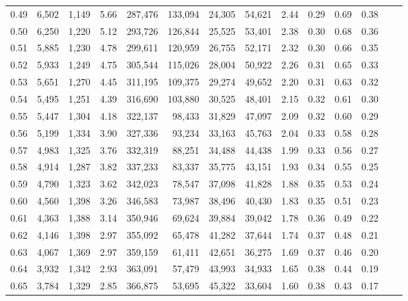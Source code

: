 \begin{tabular}{rrrrrrrrrrrrrr}
0.49 &  6,502 &  1,149 &    5.66 &  287,476 &  133,094 &  24,305 &  54,621 &  2.44 &  0.29 &  0.69 &      0.38 \\
0.50 &  6,250 &  1,220 &    5.12 &  293,726 &  126,844 &  25,525 &  53,401 &  2.38 &  0.30 &  0.68 &      0.36 \\
0.51 &  5,885 &  1,230 &    4.78 &  299,611 &  120,959 &  26,755 &  52,171 &  2.32 &  0.30 &  0.66 &      0.35 \\
0.52 &  5,933 &  1,249 &    4.75 &  305,544 &  115,026 &  28,004 &  50,922 &  2.26 &  0.31 &  0.65 &      0.33 \\
0.53 &  5,651 &  1,270 &    4.45 &  311,195 &  109,375 &  29,274 &  49,652 &  2.20 &  0.31 &  0.63 &      0.32 \\
0.54 &  5,495 &  1,251 &    4.39 &  316,690 &  103,880 &  30,525 &  48,401 &  2.15 &  0.32 &  0.61 &      0.30 \\
0.55 &  5,447 &  1,304 &    4.18 &  322,137 &   98,433 &  31,829 &  47,097 &  2.09 &  0.32 &  0.60 &      0.29 \\
0.56 &  5,199 &  1,334 &    3.90 &  327,336 &   93,234 &  33,163 &  45,763 &  2.04 &  0.33 &  0.58 &      0.28 \\
0.57 &  4,983 &  1,325 &    3.76 &  332,319 &   88,251 &  34,488 &  44,438 &  1.99 &  0.33 &  0.56 &      0.27 \\
0.58 &  4,914 &  1,287 &    3.82 &  337,233 &   83,337 &  35,775 &  43,151 &  1.93 &  0.34 &  0.55 &      0.25 \\
0.59 &  4,790 &  1,323 &    3.62 &  342,023 &   78,547 &  37,098 &  41,828 &  1.88 &  0.35 &  0.53 &      0.24 \\
0.60 &  4,560 &  1,398 &    3.26 &  346,583 &   73,987 &  38,496 &  40,430 &  1.83 &  0.35 &  0.51 &      0.23 \\
0.61 &  4,363 &  1,388 &    3.14 &  350,946 &   69,624 &  39,884 &  39,042 &  1.78 &  0.36 &  0.49 &      0.22 \\
0.62 &  4,146 &  1,398 &    2.97 &  355,092 &   65,478 &  41,282 &  37,644 &  1.74 &  0.37 &  0.48 &      0.21 \\
0.63 &  4,067 &  1,369 &    2.97 &  359,159 &   61,411 &  42,651 &  36,275 &  1.69 &  0.37 &  0.46 &      0.20 \\
0.64 &  3,932 &  1,342 &    2.93 &  363,091 &   57,479 &  43,993 &  34,933 &  1.65 &  0.38 &  0.44 &      0.19 \\
0.65 &  3,784 &  1,329 &    2.85 &  366,875 &   53,695 &  45,322 &  33,604 &  1.60 &  0.38 &  0.43 &      0.17 \\

\end{tabular}
